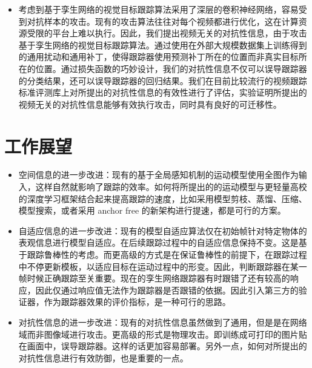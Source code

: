 \begin{itemize}
\item 考虑到基于孪生网络的视觉目标跟踪算法采用了深层的卷积神经网络，容易受到对抗样本的攻击。现有的攻击算法往往对每个视频都进行优化，这在计算资源受限的平台上难以执行。因此，我们提出视频无关的对抗性信息，由于攻击基于孪生网络的视觉目标跟踪算法。通过使用在外部大规模数据集上训练得到的通用扰动和通用补丁，使得跟踪器使用预测补丁所在的位置而非真实目标所在的位置。通过损失函数的巧妙设计，我们的对抗性信息不仅可以误导跟踪器的分类结果，还可以误导跟踪器的回归结果。我们在目前比较流行的视频跟踪标准评测库上对所提出的对抗性信息的有效性进行了评估，实验证明所提出的视频无关的对抗性信息能够有效执行攻击，同时具有良好的可迁移性。
\end{itemize}
\section{工作展望}
\begin{itemize}
\item 空间信息的进一步改进：现有的基于全局感知机制的运动模型使用全图作为输入，这样自然就影响了跟踪的效率。如何将所提出的的运动模型与更轻量高校的深度学习框架结合起来提高跟踪的速度，比如采用模型剪枝、蒸馏、压缩、模型搜索，或者采用 anchor free 的新架构进行提速，都是可行的方案。
\item 自适应信息的进一步改进：现有的模型自适应算法仅在初始帧针对特定物体的表观信息进行模型自适应。在后续跟踪过程中的自适应信息保持不变。这是基于跟踪鲁棒性的考虑。而更高级的方式是在保证鲁棒性的前提下，在跟踪过程中不停更新模板，以适应目标在运动过程中的形变。因此，判断跟踪器在某一帧时候正确跟踪至关重要。现在的孪生网络跟踪器有时跟错了还有较高的响应，因此仅通过响应值无法作为跟踪器是否跟错的依据。因此引入第三方的验证器，作为跟踪器效果的评价指标，是一种可行的思路。
\item 对抗性信息的进一步改进：现有的对抗性信息虽然做到了通用，但是是在网络域而非图像域进行攻击。更高级的形式是物理攻击。即训练成可打印的图片贴在画面中，误导跟踪器。这样的话更加容易部署。另外一点，如何对所提出的对抗性信息进行有效防御，也是重要的一点。
\end{itemize}